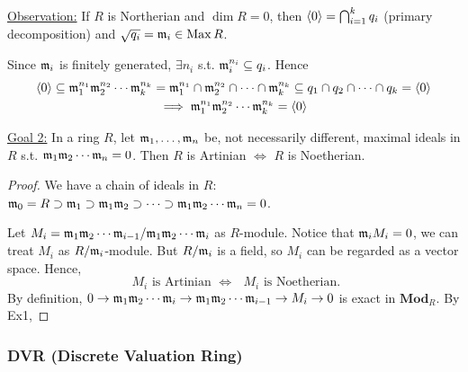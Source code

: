 \underline{Observation:} If $R$ is Northerian and $\dim R = 0$, then
$\langle0\rangle = \bigcap_{i=1}^k q_i$ (primary decomposition) and
$\sqrt{q_i} = \mathfrak{m}_i \in \operatorname{Max} R$.

Since $\mathfrak{m}_i$ is finitely generated, $\exists n_i$ s.t.
$\mathfrak{m}_i^{n_i} \subseteq q_i$. Hence 
\begin{gather*}
  \langle0\rangle \subseteq \mathfrak{m}_1^{n_1}\mathfrak{m}_2^{n_2} \dotsm \mathfrak{m}_k^{n_k} = 
\mathfrak{m}_1^{n_1} \cap \mathfrak{m}_2^{n_2} \cap \dotsm \cap \mathfrak{m}_k^{n_k} \subseteq
q_1 \cap q_2 \cap \dotsm \cap q_k = \langle0\rangle \\
\implies \mathfrak{m}_1^{n_1}\mathfrak{m}_2^{n_2} \dotsm \mathfrak{m}_k^{n_k} = \langle0\rangle
\end{gather*}

\underline{Goal 2:} In a ring $R$, let $\mathfrak{m}_1, \dots, \mathfrak{m}_n$ be,
not necessarily different, maximal ideals in $R$ s.t.
$\mathfrak{m}_1\mathfrak{m}_2 \dotsm \mathfrak{m}_n = 0$. Then $R$ is Artinian $\iff$ $R$ is Noetherian.

\begin{proof}
  We have a chain of ideals in $R$:
  $\mathfrak{m}_0 = R \supset \mathfrak{m}_1 \supset \mathfrak{m}_1\mathfrak{m}_2 \supset \dots \supset
  \mathfrak{m}_1\mathfrak{m}_2\dotsm\mathfrak{m}_n = 0$.

  Let $M_i = {\mathfrak{m}_1\mathfrak{m}_2\dotsm\mathfrak{m}_{i-1}}/{\mathfrak{m}_1\mathfrak{m}_2\dotsm\mathfrak{m}_i}$
  as $R$-module.
  Notice that $\mathfrak{m}_i M_i = 0$, we can treat $M_i$ as ${R}/{\mathfrak{m}_i}$-module.
  But ${R}/{\mathfrak{m}_i}$ is a field, so $M_i$ can be regarded as a vector
  space. Hence,
  \[ \text{ $M_i$ is Artinian $\iff$ $M_i$ is Noetherian. } \]
  By definition, $0 \to \mathfrak{m}_1\mathfrak{m}_2\dotsm\mathfrak{m}_i \to \mathfrak{m}_1\mathfrak{m}_2\dotsm\mathfrak{m}_{i-1}
  \to M_i \to 0$ is exact in $\mathbf{Mod}_R$.
  By Ex1,
\end{proof}

\subsubsection{DVR (Discrete Valuation Ring)}

